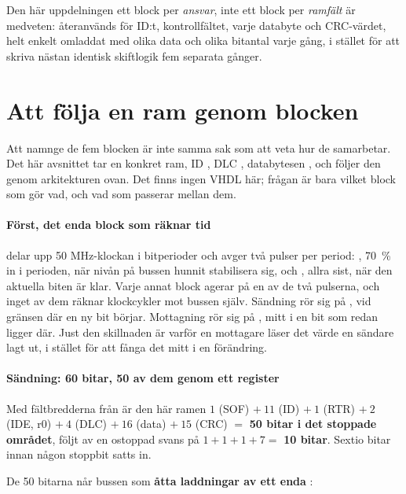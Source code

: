 Den här uppdelningen \textemdash{} ett block per \emph{ansvar}, inte ett block per \emph{ramfält}
\textemdash{} är medveten:  återanvänds för ID:t, kontrollfältet, varje databyte
och CRC-värdet, helt enkelt omladdat med olika data och olika bitantal varje gång, i stället för att
skriva nästan identisk skiftlogik fem separata gånger.

\section{Att följa en ram genom blocken}
\label{c11:sec:trace}

Att namnge de fem blocken är inte samma sak som att veta hur de samarbetar. Det här avsnittet tar en
konkret ram, ID , DLC , databytesen , och följer den genom
arkitekturen ovan. Det finns ingen VHDL här; frågan är bara vilket block som gör vad, och vad som
passerar mellan dem.

\paragraph{Först, det enda block som räknar tid}
 delar upp 50 MHz-klockan i bitperioder och avger två pulser per period:
, 70~\% in i perioden, när nivån på bussen hunnit stabilisera sig, och ,
allra sist, när den aktuella biten är klar. Varje annat block agerar på en av de två pulserna, och
inget av dem räknar klockcykler mot bussen själv. Sändning rör sig på , vid gränsen
där en ny bit börjar. Mottagning rör sig på , mitt i en bit som redan ligger där. Just
den skillnaden är varför en mottagare läser det värde en sändare lagt ut, i stället för att fånga
det mitt i en förändring.

\paragraph{Sändning: 60 bitar, 50 av dem genom ett register}
Med fältbredderna från  är den här ramen $1$ (SOF) $+\ 11$ (ID) $+\ 1$ (RTR)
$+\ 2$ (IDE, r0) $+\ 4$ (DLC) $+\ 16$ (data) $+\ 15$ (CRC) $=$ \textbf{50 bitar i det stoppade
området}, följt av en ostoppad svans på $1 + 1 + 1 + 7 =$ \textbf{10 bitar}. Sextio bitar innan någon
stoppbit satts in.

De 50 bitarna når bussen som \textbf{åtta laddningar av ett enda }:


